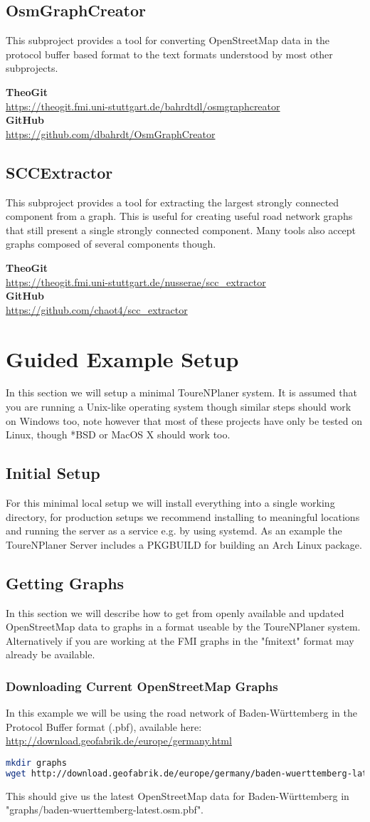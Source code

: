 \documentclass[titlepage,parskip=true]{scrartcl}
\newcommand{\repobox}[2]{
	\begin{shaded}
		\textbf{TheoGit}\\\hspace{5mm}\url{#1}\\
		\textbf{GitHub}\\\hspace{5mm}\url{#2}
	\end{shaded}
}
\begin{document}
\subsection{OsmGraphCreator}
This subproject provides a tool for converting OpenStreetMap data in the
protocol buffer based format to the text formats understood by most other
subprojects.
\repobox{https://theogit.fmi.uni-stuttgart.de/bahrdtdl/osmgraphcreator}{https://github.com/dbahrdt/OsmGraphCreator}
\subsection{SCCExtractor}
This subproject provides a tool for extracting the largest strongly connected
component from a graph. This is useful for creating useful road network graphs
that still present a single strongly connected component. Many tools also
accept graphs composed of several components though.
\repobox{https://theogit.fmi.uni-stuttgart.de/nusserae/scc\_extractor}{https://github.com/chaot4/scc\_extractor}
\section{Guided Example Setup}
In this section we will setup a minimal ToureNPlaner system. It is assumed that
you are running a Unix-like operating system though similar steps should work
on Windows too, note however that most of these projects have only be tested on
Linux, though *BSD or MacOS X should work too.
\label{sec:setup}
\subsection{Initial Setup}
For this minimal local setup we will install everything into a single working
directory, for production setups we recommend installing to meaningful
locations and running the server as a service e.g. by using systemd. As an
example the ToureNPlaner Server includes a PKGBUILD for building an Arch Linux
package.
\subsection{Getting Graphs}
In this section we will describe how to get from openly available and updated
OpenStreetMap data to graphs in a format useable by the ToureNPlaner system.
Alternatively if you are working at the FMI graphs in the "fmitext" format may
already be available.
\subsubsection{Downloading Current OpenStreetMap Graphs}
In this example we will be using the road network of Baden-Württemberg in the
Protocol Buffer format (.pbf), available here:
\url{http://download.geofabrik.de/europe/germany.html}
\begin{lstlisting}[language=bash]
mkdir graphs
wget http://download.geofabrik.de/europe/germany/baden-wuerttemberg-latest.osm.pbf -P graphs
\end{lstlisting}
This should give us the latest OpenStreetMap data for Baden-Württemberg in
"graphs/baden-wuerttemberg-latest.osm.pbf".
\end{document}
